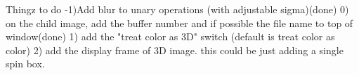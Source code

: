 Thingz to do
-1)Add blur to unary operations (with adjustable sigma)(done)
0) on the child image, add the buffer number and if possible the file name to top of window(done)
1) add the "treat color as 3D" switch (default is treat color as color)
2) add the display frame of 3D image. this could be just adding a single spin box. 

